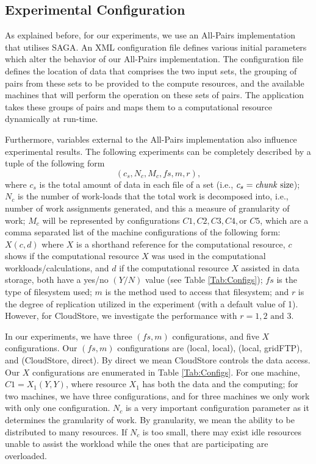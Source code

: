 \documentclass{rspublic}
\begin{document}
\vspace{-0.3cm}

\subsection{Experimental Configuration}

As explained before, for our experiments, we use an All-Pairs
implementation that utilises SAGA. An XML configuration file defines
various initial parameters which alter the behavior of our All-Pairs
implementation. The configuration file defines the location of data that
comprises the two input sets, the grouping of pairs from these sets to
be provided to the compute resources, and the available machines that
will perform the operation on these sets of pairs. The application takes
these groups of pairs and maps them to a computational resource
dynamically at run-time.

Furthermore, variables external to the All-Pairs implementation also
influence experimental results. The following experiments can be
completely described by a tuple of the following form
 \begin{equation}
(c_s, N_c, M_c, f\!s, m,r),
\label{Eq:tuple}
\end{equation}
where $c_s$ is the total amount of data in each file of a set (i.e.,
$c_s=\mbox{\textit{chunk} size}$); $N_c$ is the number of work-loads
that the total work is decomposed into, i.e., number of work assignments
generated, and this a measure of granularity of work; $M_c$ will be
represented by configurations $C1, C2, C3, C4, \mbox{or } C5$, which are
a comma separated list of the machine configurations of the following
form: $X(c, d)$ where $X$ is a shorthand reference for the computational
resource, $c$ shows if the computational resource $X$ was used in the
computational workloads/calculations, and $d$ if the computational
resource $X$ assisted in data storage, both have a yes/no $(Y/N)$ value
(see Table \ref{Tab:Configs}); $f\!s$ is the type of filesystem used;
$m$ is the method used to access that filesystem; and $r$ is the degree
of replication utilized in the experiment (with a default value of 1).
However, for CloudStore, we investigate the performance with $r = 1, 2
\mbox{ and } 3$.

In our experiments, we have three $(f\!s, m)$ configurations, and five
$X$ configurations. Our $(f\!s, m)$ configurations are (local, local),
(local, gridFTP), and (CloudStore, direct). By direct we mean CloudStore
controls the data access. Our $X$ configurations are enumerated in Table
\ref{Tab:Configs}. For one machine, $C1=X_1(Y,Y)$, where resource $X_1$
has both the data and the computing; for two machines, we have three
configurations, and for three machines we only work with only one
configuration. $N_c$ is a very important configuration parameter as it
determines the granularity of work. By granularity, we mean the ability
to be distributed to many resources.  If $N_c$ is too small, there may
exist idle resources unable to assist the workload while the ones that
are participating are overloaded.
\end{document}
